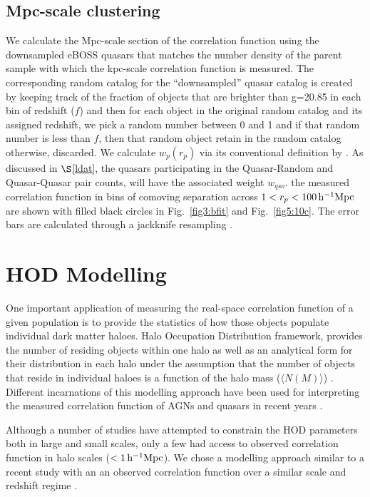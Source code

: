 \documentclass[useAMS,usenatbib]{mn2e}
\begin{document}
\subsection{Mpc-scale clustering}\label{mpcls}

We calculate the Mpc-scale section of the correlation function using the 
downsampled eBOSS quasars that matches the number density of the parent sample 
with which the kpc-scale correlation function is measured. The corresponding 
random catalog for the ``downsampled'' quasar catalog is created by keeping 
track of the fraction of objects that are brighter than g=20.85 in each bin of 
redshift ($f$) and then for each object in the original random catalog and its 
assigned redshift, we pick a random number between 0 and 1 and if that random 
number is less than $f$, then that random object retain in the random catalog 
otherwise, discarded. We calculate $w_p(r_p)$  via its conventional definition by \citet{ls93}. 
As discussed in $\S$\ref{ldat}, the quasars participating in the Quasar-Random and Quasar-Quasar pair counts, will have the associated weight $w_{qso}$. 
the measured correlation function in bins of comoving separation across $1<r_p<100 \, \rm h^{-1} Mpc$ are shown with filled black circles in Fig.\, \ref{fig3:bfit} and Fig.\, \ref{fig5:10c}. The error bars are calculated through a jackknife resampling \citep[see, e.g., eqn. 4 of][]{ef15}.  


\section{HOD Modelling}\label{hodmod}

One important application of measuring the real-space correlation function of a 
given population is to provide the statistics of how those objects populate 
individual dark matter haloes.  Halo Occupation Distribution framework, provides 
the number of residing objects within one halo as well as an analytical form for 
their distribution in each halo under the assumption that the number of objects 
that reside in individual haloes is a function of the halo mass ($\langle 
N(M)\rangle$) \citep{pea00,sel00,sc01}. Different incarnations of this modelling 
approach have been used for interpreting the measured correlation function of 
AGNs and quasars in recent years \citep[see, e.g., 
][]{po04,coil04,Aba05,coi06,coi07,coi09,mi11,ric12,ko12,kru12,ric13,sh13,Coi16,coi17}.  

Although a number of studies have attempted to constrain the HOD parameters both 
in large and small scales, only a few had access to observed correlation 
function in halo scales ($<1 \, \rm h^{-1} Mpc$). We chose a modelling approach 
similar to a recent study with an an observed correlation function over a 
similar scale and redshift regime \citep{ko12}.  
\end{document}
